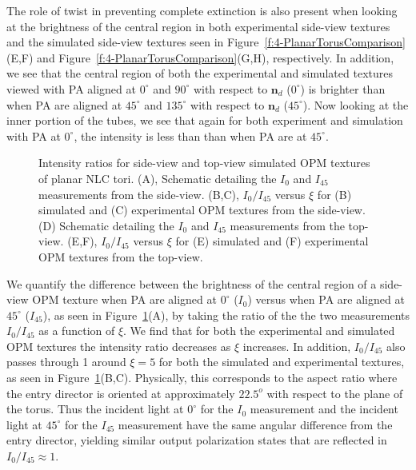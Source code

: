 The role of twist in preventing complete extinction is also present when looking at the brightness of the central region in both experimental side-view textures and the simulated side-view textures seen in Figure~\ref{f:4-PlanarTorusComparison}(E,F) and Figure~\ref{f:4-PlanarTorusComparison}(G,H), respectively.
In addition, we see that the central region of both the experimental and simulated textures viewed with PA aligned at $0^{\circ}$ and $90^{\circ}$ with respect to $\mathbf{n}_d$ ($0^{\circ}$) is brighter than when PA are aligned at $45^{\circ}$ and $135^{\circ}$ with respect to $\mathbf{n}_d$ ($45^{\circ}$).
Now looking at the inner portion of the tubes, we see that again for both experiment and simulation with PA at $0^{\circ}$, the intensity is less than than when PA are at $45^{\circ}$.
\begin{figure}
\centering
\caption{Intensity ratios for side-view and top-view simulated OPM textures of planar NLC tori.
(A), Schematic detailing the $I_0$ and $I_{45}$ measurements from the side-view.
(B,C), $I_0/I_{45}$ versus $\xi$ for (B) simulated and (C) experimental OPM textures from the side-view.
(D) Schematic detailing the $I_0$ and $I_{45}$ measurements from the top-view.
(E,F), $I_0/I_{45}$ versus $\xi$ for (E) simulated and (F) experimental OPM textures from the top-view. }\label{f:4-PlanarIntRatio}
\end{figure}

We quantify the difference between the brightness of the central region of a side-view OPM texture when PA are aligned at $0^{\circ}$ ($I_0$) versus when PA are aligned at $45^{\circ}$ ($I_{45}$), as seen in Figure~\ref{f:4-PlanarIntRatio}(A), by taking the ratio of the the two measurements $I_0/I_{45}$ as a function of $\xi$.
We find that for both the experimental and simulated OPM textures the intensity ratio decreases as $\xi$ increases. In addition, $I_0/I_{45}$ also passes through 1 around $\xi = 5$ for both the simulated and experimental textures, as seen in Figure~\ref{f:4-PlanarIntRatio}(B,C).
Physically, this corresponds to the aspect ratio where the entry director is oriented at approximately $22.5^o$ with respect to the plane of the torus.
Thus the incident light at $0^{\circ}$ for the $I_0$ measurement and the incident light at $45^{\circ}$ for the $I_{45}$ measurement have the same angular difference from the entry director, yielding similar output polarization states that are reflected in $I_0/I_{45} \approx 1$.


